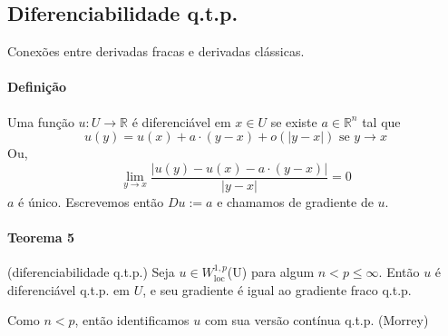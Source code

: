 \documentclass[a4paper, 11pt]{book}
\newcommand{\R}{\mathbb{R}}
\newcommand{\rn}{{\mathbb{R}^n}}
\begin{document}
\subsection{Diferenciabilidade q.t.p.}

Conexões entre derivadas fracas e derivadas clássicas.

\paragraph{Definição} Uma função $u:U\rightarrow \R$ é diferenciável em $x \in U$ se existe $a \in \rn$ tal que \[
u(y) = u(x) + a \cdot (y-x) + o(|y-x|) \text{ se } y \rightarrow x	
\]
Ou, \[
\lim_{y\rightarrow x} \frac{ |u(y) - u(x) - a\cdot (y-x)| }{|y-x|} =0 
\]
$a$ é único. Escrevemos então $Du := a$ e chamamos de gradiente de $u$.

\paragraph{Teorema 5}\label{t:sobolev-diferenciabilidade-qtp} (diferenciabilidade q.t.p.) Seja $u \in W^{1,p}_{\text{loc}}$(U) para algum $n < p \leq \infty$. Então $u$ é diferenciável q.t.p. em $U$, e seu gradiente é igual ao gradiente fraco q.t.p.

Como $n<p$, então identificamos $u$ com sua versão contínua q.t.p. (Morrey)
\end{document}
